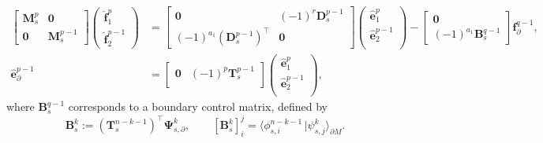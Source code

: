 \documentclass{elsarticle}
\newcommand*{\dual}[1]{\ensuremath{\widehat{#1}}}
\newcommand{\dualpr}[3][]{\ensuremath{\langle #2 \, \vert #3 \rangle_{#1}}}
\begin{document}
{\begin{equation}\label{eq:alg_primal}
\begin{aligned}
    \begin{bmatrix}
        \mathbf{M}^p_s & \mathbf{0} \\
        \mathbf{0} & \mathbf{M}^{p-1}_s
    \end{bmatrix}
    \begin{pmatrix}
    \dual{\mathbf{f}}^p_1 \\
    \dual{\mathbf{f}}^{p-1}_2
    \end{pmatrix} &=
    \begin{bmatrix}
        \mathbf{0} & (-1)^r\mathbf{D}^{p-1}_s \\
        (-1)^{a_1}(\mathbf{D}^{p-1}_s)^\top & \mathbf{0}
    \end{bmatrix}
    \begin{pmatrix}
    \dual{\mathbf{e}}^p_1 \\
    \dual{\mathbf{e}}^{p-1}_2 \\
    \end{pmatrix} - \begin{bmatrix}
        \mathbf{0} \\
        (-1)^{a_1} \mathbf{B}^{q-1}_{s}
    \end{bmatrix} \mathbf{f}^{q-1}_\partial, \\
    \dual{\mathbf{e}}^{p-1}_\partial 
    &= 
    \begin{bmatrix}
    \mathbf{0} & (-1)^p\mathbf{T}^{p-1}_s \\
    \end{bmatrix}
    \begin{pmatrix}
    \dual{\mathbf{e}}^p_1 \\
    \dual{\mathbf{e}}^{p-1}_2 \\
    \end{pmatrix}, 
\end{aligned}
\end{equation}
where $\mathbf{B}^{q-1}_{s}$ corresponds to a boundary control matrix, defined by
\begin{equation}\label{eq:control_mat}
    \mathbf{B}^{k}_s := (\mathbf{T}^{n-k-1}_s)^\top \mathbf{\Psi}^{k}_{s, \partial}, \qquad [\mathbf{B}^{k}_s]_{i}^j = \dualpr[\partial M]{\phi_{s, i}^{n-k-1}}{\psi^{k}_{s, j}}.
\end{equation}


}
\end{document}
